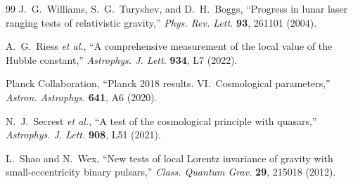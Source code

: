 \documentclass[12pt,a4paper,twocolumn]{article}
\begin{document}
\begin{thebibliography}{99}
J.~G.~Williams, S.~G.~Turyshev, and D.~H.~Boggs, ``Progress
in lunar laser ranging tests of relativistic gravity,''
\textit{Phys. Rev. Lett.} \textbf{93}, 261101 (2004).

A.~G.~Riess \textit{et al.}, ``A comprehensive measurement of the
local value of the Hubble constant,''
\textit{Astrophys. J. Lett.} \textbf{934}, L7 (2022).

Planck Collaboration, ``Planck 2018 results. VI.\ Cosmological
parameters,'' \textit{Astron. Astrophys.} \textbf{641}, A6 (2020).

N.~J.~Secrest \textit{et al.}, ``A test of the cosmological principle
with quasars,'' \textit{Astrophys. J. Lett.} \textbf{908}, L51 (2021).

L.~Shao and N.~Wex, ``New tests of local Lorentz invariance of
gravity with small-eccentricity binary pulsars,''
\textit{Class. Quantum Grav.} \textbf{29}, 215018 (2012).

\end{thebibliography}
\end{document}
